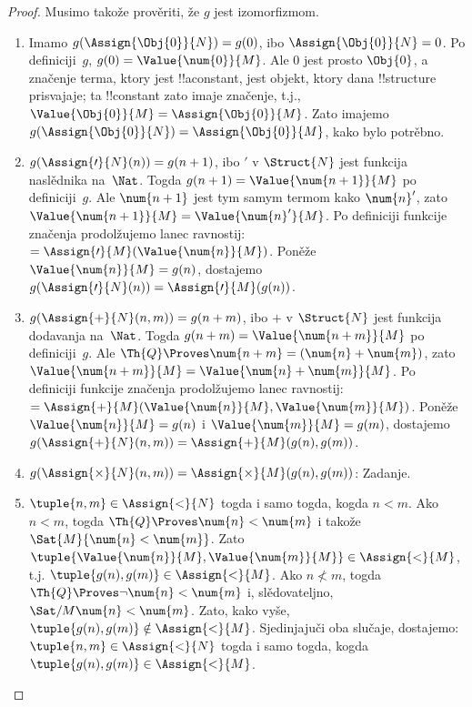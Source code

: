 \documentclass[../../../include/open-logic-section]{subfiles}
\begin{document}
\begin{proof}
Musimo takože prověriti, že $g$ jest izomorfizmom.
\begin{enumerate}
\item Imamo $g(\Assign{\Obj{0}}{N}) = g(0)$, ibo
  $\Assign{\Obj{0}}{N} = 0$. Po definiciji~$g$, $g(0) =
  \Value{\num{0}}{M}$. Ale $\num{0}$ jest prosto $\Obj{0}$, a
  značenje terma, ktory jest !!a{constant}, jest objekt, ktory dana
  !!{structure} prisvajaje; ta !!{constant} zato imaje značenje, t.j.,
  $\Value{\Obj{0}}{M} = \Assign{\Obj{0}}{M}$. Zato imajemo
  $g(\Assign{\Obj{0}}{N}) = \Assign{\Obj{0}}{M}$, kako bylo potrěbno.
\item $g(\Assign{\prime}{N}(n)) = g(n+1)$, ibo $\prime$ v
  $\Struct{N}$ jest funkcija naslědnika na~$\Nat$. Togda
  $g(n+1) = \Value{\num{n+1}}{M}$ po definiciji~$g$. Ale
  $\num{n+1}$ jest tym samym termom kako $\num{n}'$, zato
  $\Value{\num{n+1}}{M} = \Value{\num{n}'}{M}$. Po definiciji
  funkcije značenja prodolžujemo lanec ravnostij: $=
  \Assign{\prime}{M}(\Value{\num{n}}{M})$. Poněže
  $\Value{\num{n}}{M} = g(n)$, dostajemo
  $g(\Assign{\prime}{N}(n)) = \Assign{\prime}{M}(g(n))$.
\item $g(\Assign{+}{N}(n,m)) = g(n+m)$, ibo $+$ v $\Struct{N}$ jest
  funkcija dodavanja na~$\Nat$. Togda $g(n+m) =
  \Value{\num{n+m}}{M}$ po definiciji~$g$. Ale $\Th{Q} \Proves
  \num{n+m} = (\num{n} + \num{m})$, zato $\Value{\num{n+m}}{M} =
  \Value{\num{n}+\num{m}}{M}$. Po definiciji funkcije značenja
  prodolžujemo lanec ravnostij: $=
  \Assign{+}{M}(\Value{\num{n}}{M},\Value{\num{m}}{M})$. Poněže
  $\Value{\num{n}}{M} = g(n)$ i $\Value{\num{m}}{M} = g(m)$,
  dostajemo $g(\Assign{+}{N}(n, m)) =
  \Assign{+}{M}(g(n), g(m))$.
\item $g(\Assign{\times}{N}(n, m)) =
  \Assign{\times}{M}(g(n), g(m))$: Zadanje.
\item $\tuple{n,m} \in \Assign{<}{N}$ togda i samo togda, kogda $n <
  m$. Ako $n < m$, togda $\Th{Q} \Proves \num{n} < \num{m}$ i
  takože $\Sat{M}{\num{n} < \num{m}}$. Zato
  $\tuple{\Value{\num{n}}{M}, \Value{\num{m}}{M}} \in
  \Assign{<}{M}$, t.j. $\tuple{g(n), g(m)} \in \Assign{<}{M}$. Ako
  $n \not< m$, togda $\Th{Q} \Proves \lnot \num{n} < \num{m}$ i,
  slědovateljno, $\Sat/{M}{\num{n} < \num{m}}$. Zato, kako vyše,
  $\tuple{g(n), g(m)} \notin \Assign{<}{M}$. Sjedinjajuči oba slučaje,
  dostajemo:
  $\tuple{n,m} \in \Assign{<}{N}$ togda i samo togda, kogda
  $\tuple{g(n), g(m)} \in \Assign{<}{M}$.
\end{enumerate}
\end{proof}
\end{document}
